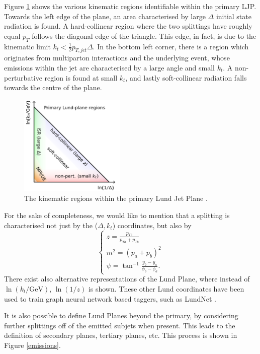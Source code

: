 \documentclass[10pt,a4paper]{book}
\begin{document}
Figure \ref{LundPlane} shows the various kinematic regions identifiable within the primary LJP. Towards the left edge of the plane, an area characterised by large $\Delta$ initial state radiation is found. A hard-collinear region where the two splittings have roughly equal $p_T$ follows the diagonal edge of the triangle. This edge, in fact, is due to the kinematic limit $k_t < \frac{1}{2}p_{T,jet}\Delta$. In the bottom left corner, there is a region which originates from multiparton interactions and the underlying event, whose emissions within the jet are characterised by a large angle and small $k_t$. A non-perturbative region is found at small $k_t$, and lastly soft-collinear radiation falls towards the centre of the plane.

\begin{figure}[]
\centering
\includegraphics[width=0.45\textwidth]{lund_plane}
\caption{The kinematic regions within the primary Lund Jet Plane \cite{Dreyer:2018nbf}.}
\label{LundPlane}
\end{figure}

For the sake of completeness, we would like to mention that a splitting is characterised not just by the ($\Delta, k_t$) coordinates, but also by
\begin{equation}
\begin{cases}
 z = \frac{p_{Tb}}{p_{Ta}+p_{Tb}} \\
 m^2 = (p_a + p_b)^2 \\
 \psi = \tan^{-1} \frac{y_b - y_a}{\phi_b - \phi_a}.
\end{cases}
\label{z m psi}
\end{equation}
There exist also alternative representations of the Lund Plane, where instead of $\ln(k_t/\mathrm{GeV})$, $\ln(1/z)$ is shown. These other Lund coordinates have been used to train graph neural network based taggers, such as LundNet \cite{Dreyer:2020brq}. 

It is also possible to define Lund Planes beyond the primary, by considering further splittings off of the emitted subjets when present. This leads to the definition of secondary planes, tertiary planes, etc. This process is shown in Figure \ref{emissions}.
\end{document}
